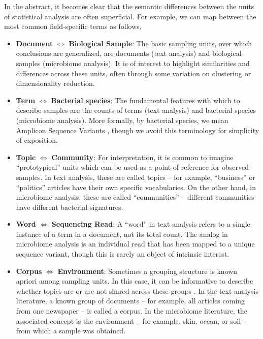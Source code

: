 \documentclass[oupdraft]{bio}
\begin{document}
In the abstract, it becomes clear that the semantic differences between the
units of statistical analysis are often superficial. For example, we can map
between the most common field-specific terms as follows,

\begin{itemize}
  \item \textbf{Document} $\iff$ \textbf{Biological Sample}: The basic sampling
    units, over which conclusions are generalized, are documents (text analysis)
    and biological samples (microbiome analysis). It is of interest to highlight
    similarities and differences across these units, often through some
    variation on clustering or dimensionality reduction.
  \item \textbf{Term} $\iff$ \textbf{Bacterial species}: The fundamental
    features with which to describe samples are the counts of terms (text
    analysis) and bacterial species (microbiome analysis). More formally, by
    bacterial species, we mean Amplicon Sequence Variants
    \citep{callahan2017exact}, though we avoid this terminology for simplicity
    of exposition.
  \item \textbf{Topic} $\iff$ \textbf{Community}: For interpretation, it is
    common to imagine ``prototypical'' units which can be used as a point of
    reference for observed samples. In text analysis, these are called topics --
    for example, ``business'' or ``politics'' articles have their own specific
    vocabularies. On the other hand, in microbiome analysis, these are called
    ``communities'' -- different communities have different bacterial
    signatures.
  \item \textbf{Word} $\iff$ \textbf{Sequencing Read}: A ``word'' in text analysis refers
    to a single instance of a term in a document, not its total count. The
    analog in microbiome analysis is an individual read that has been mapped to
    a unique sequence variant, though this is rarely an object of intrinsic interest.
  \item \textbf{Corpus} $\iff$ \textbf{Environment}: Sometimes a grouping
    structure is known apriori among sampling units. In this case, it can be
    informative to describe whether topics are or are not shared across these
    groups \citep{teh2005sharing}. In the text analysis literature, a known group
    of documents -- for example, all articles coming from one newspaper -- is
    called a corpus. In the microbiome literature, the associated concept is the
    environment -- for example, skin, ocean, or soil -- from which a sample was
    obtained.
\end{itemize}
\end{document}

